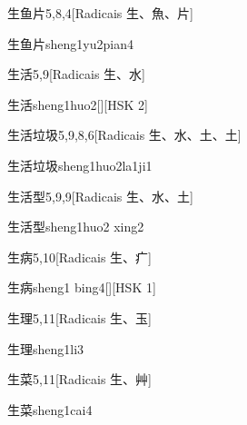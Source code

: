 \begin{entry}{生鱼片}{5,8,4}[Radicais ⽣、⿂、⽚]
  \begin{phonetics}{生鱼片}{sheng1yu2pian4}
  \end{phonetics}
\end{entry}

\begin{entry}{生活}{5,9}[Radicais ⽣、⽔]
  \begin{phonetics}{生活}{sheng1huo2}[][HSK 2]
  \end{phonetics}
\end{entry}

\begin{entry}{生活垃圾}{5,9,8,6}[Radicais ⽣、⽔、⼟、⼟]
  \begin{phonetics}{生活垃圾}{sheng1huo2la1ji1}
  \end{phonetics}
\end{entry}

\begin{entry}{生活型}{5,9,9}[Radicais ⽣、⽔、⼟]
  \begin{phonetics}{生活型}{sheng1huo2 xing2}
  \end{phonetics}
\end{entry}

\begin{entry}{生病}{5,10}[Radicais ⽣、⽧]
  \begin{phonetics}{生病}{sheng1 bing4}[][HSK 1]
  \end{phonetics}
\end{entry}

\begin{entry}{生理}{5,11}[Radicais ⽣、⽟]
  \begin{phonetics}{生理}{sheng1li3}
  \end{phonetics}
\end{entry}

\begin{entry}{生菜}{5,11}[Radicais ⽣、⾋]
  \begin{phonetics}{生菜}{sheng1cai4}
  \end{phonetics}
\end{entry}

